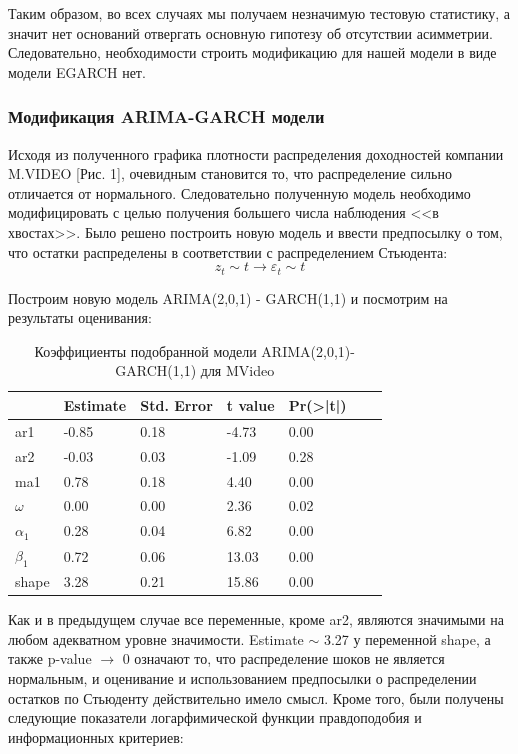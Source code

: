 \documentclass[a4paper,12pt,twoside]{article}
\begin{document}
Таким образом, во всех случаях мы получаем незначимую тестовую статистику, а значит нет оснований отвергать основную гипотезу об отсутствии асимметрии. Следовательно, необходимости строить модификацию для нашей модели в виде модели EGARCH нет.


\subsubsection{Модификация ARIMA-GARCH модели}

Исходя из полученного графика плотности распределения доходностей компании M.VIDEO [Рис. 1], очевидным становится то, что распределение сильно отличается от нормального.
Следовательно полученную модель необходимо модифицировать с целью получения большего числа наблюдения <<в хвостах>>.
Было решено построить новую модель и ввести предпосылку о том, что остатки распределены в соответствии с распределением Стьюдента:
$$
z_t \sim t \rightarrow \varepsilon_t \sim t
$$

Построим новую модель ARIMA(2,0,1) - GARCH(1,1) и посмотрим на результаты оценивания:


\begin{table}[!h]
\centering
\begin{tabular}{lllllll}
  \hline
          &  Estimate & Std. Error &  t value  &  Pr(>|t|) \\
  \hline
  ar1 & -0.85 &  0.18 & -4.73 & 0.00 \\
  ar2 & -0.03 &  0.03 & -1.09 & 0.28 \\
  ma1 & 0.78 &  0.18 & 4.40 & 0.00 \\
  $\omega$ & 0.00 &  0.00 & 2.36 & 0.02 \\
  $\alpha_1$ & 0.28 &  0.04 & 6.82 & 0.00 \\
  $\beta_1$ & 0.72 &  0.06 & 13.03 & 0.00 \\
  shape & 3.28 &  0.21 & 15.86 & 0.00 \\
  \hline
\end{tabular}
\caption{Коэффициенты подобранной модели ARIMA(2,0,1)-GARCH(1,1) для MVideo}
\end{table}


Как и в предыдущем случае все переменные, кроме ar2, являются значимыми на любом адекватном уровне значимости. Estimate $\sim$ 3.27 у переменной shape, а также p-value $\rightarrow$  0 означают то, что распределение шоков не является нормальным, и оценивание и использованием предпосылки о распределении остатков по Стьюденту действительно имело смысл.
Кроме того, были получены следующие показатели логарфимической функции правдоподобия и информационных критериев:
\end{document}
